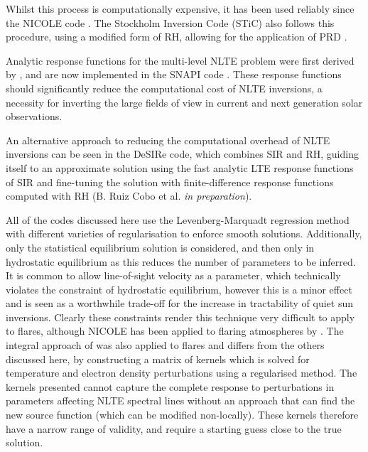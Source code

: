 Whilst this process is computationally expensive, it has been used reliably since the NICOLE code \citep[developed from \citet{SocasNavarro2000} but no longer using fixed departure coefficients]{Socas-Navarro2015}.
The Stockholm Inversion Code (STiC) also follows this procedure, using a modified form of RH, allowing for the application of PRD \citep{2019dlcr}.

Analytic response functions for the multi-level NLTE problem were first derived by \citet{Milic2017}, and are now implemented in the SNAPI code \citep{Milic2018}.
These response functions should significantly reduce the computational cost of NLTE inversions, a necessity for inverting the large fields of view in current and next generation solar observations.

An alternative approach to reducing the computational overhead of NLTE inversions can be seen in the DeSIRe code, which combines SIR and RH, guiding itself to an approximate solution using the fast analytic LTE response functions of SIR and fine-tuning the solution with finite-difference response functions computed with RH (B. Ruiz Cobo et al. \emph{in preparation}).

All of the codes discussed here use the Levenberg-Marquadt regression method with different varieties of regularisation to enforce smooth solutions.
Additionally, only the statistical equilibrium solution is considered, and then only in hydrostatic equilibrium as this reduces the number of parameters to be inferred.
It is common to allow line-of-sight velocity as a parameter, which technically violates the constraint of hydrostatic equilibrium, however this is a minor effect and is seen as a worthwhile trade-off for the increase in tractability of quiet sun inversions.
Clearly these constraints render this technique very difficult to apply to flares, although NICOLE has been applied to flaring atmospheres by \citet{Kuridze2018}.
The integral approach of \citep{Metcalf1990a} was also applied to flares and differs from the others discussed here, by constructing a matrix of kernels which is solved for temperature and electron density perturbations using a regularised method.
The kernels presented cannot capture the complete response to perturbations in parameters affecting NLTE spectral lines without an approach that can find the new source function (which can be modified non-locally).
These kernels therefore have a narrow range of validity, and require a starting guess close to the true solution.

